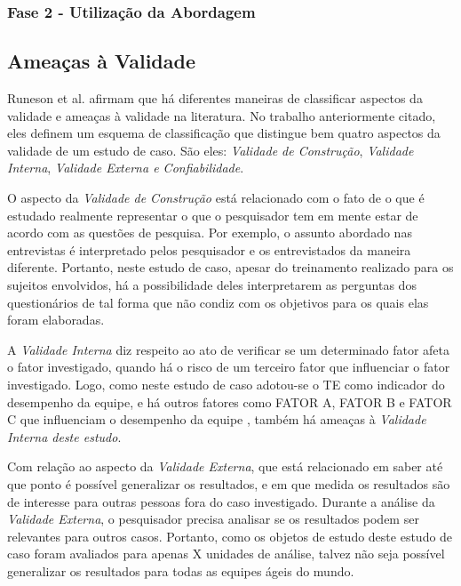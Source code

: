 \subsubsection{Fase 2 - Utilização da Abordagem}
\label{estudodecaso:design:procedimento:abordagem}



\subsection{Ameaças à Validade}
\label{estudodecaso:design:ameacas}

Runeson et al. \cite{runeson} afirmam que há diferentes maneiras de classificar aspectos da validade e ameaças à validade na literatura. No trabalho anteriormente citado, eles definem um esquema de classificação que distingue bem quatro aspectos da validade de um estudo de caso. São eles: \textit{Validade de Construção}, \textit{Validade Interna}, \textit{Validade Externa e Confiabilidade}.

O aspecto da \textit{Validade de Construção} está relacionado com o fato de o que é estudado realmente representar o que o pesquisador tem em mente estar de acordo com as questões de pesquisa. Por exemplo, o assunto abordado nas entrevistas é interpretado pelos pesquisador e os entrevistados da maneira diferente. Portanto, neste estudo de caso, apesar do treinamento realizado para os sujeitos envolvidos, há a possibilidade deles interpretarem as perguntas dos questionários de tal forma que não condiz com os objetivos para os quais elas foram elaboradas.

A \textit{Validade Interna} diz respeito ao ato de verificar se um determinado fator afeta o fator investigado, quando há o risco de um terceiro fator que influenciar o fator investigado. Logo, como neste estudo de caso adotou-se o TE como indicador do desempenho da equipe, e há outros fatores como FATOR A, FATOR B e FATOR C que influenciam o desempenho da equipe \cite{}, também há ameaças à \textit{Validade Interna deste estudo}.

Com relação ao aspecto da \textit{Validade Externa}, que está relacionado em saber até que ponto é possível generalizar os resultados, e em que medida os resultados são de interesse para outras pessoas fora do caso investigado. Durante a análise da \textit{Validade Externa}, o pesquisador precisa analisar se os resultados podem ser relevantes para outros casos. Portanto, como os objetos de estudo deste estudo de caso foram avaliados para apenas X unidades de análise, talvez não seja possível generalizar os resultados para todas as equipes ágeis do mundo.

